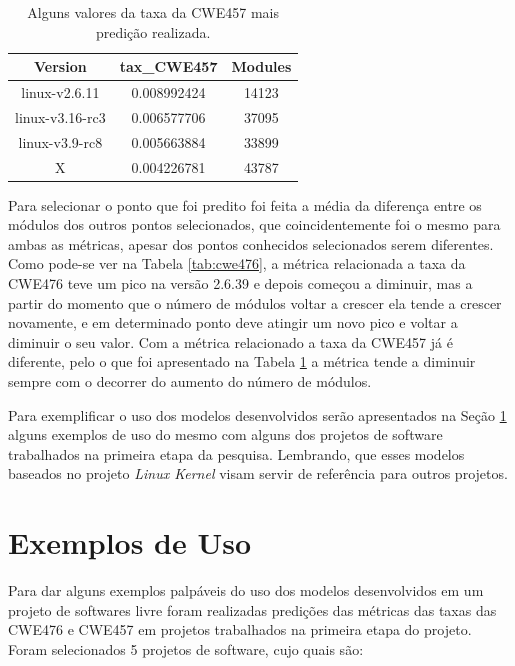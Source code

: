 \begin{table}[h]
\centering
\begin{tabular}{ccc}
\hline
\rowcolor[HTML]{EFEFEF} 
{Version}   & {tax\_CWE457} & {Modules} \\ \hline
linux-v2.6.11   & 0.008992424       & 14123         \\ \hline
linux-v3.16-rc3 & 0.006577706       & 37095         \\ \hline
linux-v3.9-rc8  & 0.005663884       & 33899         \\ \hline
X               & 0.004226781       & 43787         \\ \hline
\end{tabular}
\caption{Alguns valores da taxa da CWE457 mais predição realizada.}
\label{tab:cwe457}
\end{table}

Para selecionar o ponto que foi predito foi feita a média da diferença entre os
módulos dos outros pontos selecionados, que coincidentemente foi o mesmo para
ambas as métricas, apesar dos pontos conhecidos selecionados serem diferentes.
Como pode-se ver na Tabela \ref{tab:cwe476}, a métrica relacionada a taxa da
CWE476 teve um pico na versão 2.6.39 e depois começou a diminuir, mas a partir do
momento que o número de módulos voltar a crescer ela tende a crescer novamente,
e em determinado ponto deve atingir um novo pico e voltar a diminuir o seu
valor. Com a métrica relacionado a taxa da CWE457 já é diferente, pelo o que foi
apresentado na Tabela \ref{tab:cwe457} a métrica tende a diminuir sempre com o
decorrer do aumento do número de módulos.

Para exemplificar o uso dos modelos desenvolvidos serão apresentados na Seção
\ref{exemplosdeuso} alguns exemplos de uso do mesmo com alguns dos projetos de
software trabalhados na primeira etapa da pesquisa. Lembrando, que esses modelos
baseados no projeto \textit{Linux Kernel} visam servir de referência para outros
projetos.




\section{Exemplos de Uso}\label{exemplosdeuso}

Para dar alguns exemplos palpáveis do uso dos modelos desenvolvidos em um
projeto de softwares livre foram realizadas predições das métricas das taxas das
CWE476 e CWE457 em projetos trabalhados na primeira etapa do projeto. Foram
selecionados 5 projetos de software, cujo quais são:

